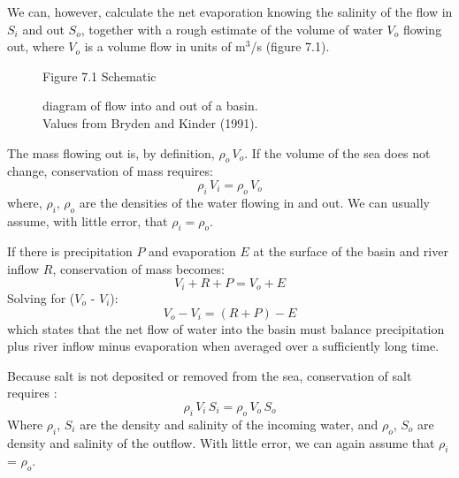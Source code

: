 We can, however, calculate the net evaporation knowing the salinity of
the flow in $S_i$ and out $S_o$, together with a rough estimate of the
volume of water $V_o$ flowing out, where $V_o$ is a volume flow in
units of m$^3$/s (figure 7.1).
\begin{figure}[h!]
\vspace{-1ex}
\centering
\footnotesize
Figure 7.1 Schematic \rule{0mm}{3ex}diagram of flow into and out of a
basin.\\Values from Bryden and Kinder (1991).

\label{fig:basin}
\vspace{-1ex}
\end{figure}

The mass flowing out is, by definition, $\rho_o \, V_o$. If the volume
of the sea does not change, conservation of mass requires:
\begin{equation}
\rho_i\,V_i = \rho_o\,V_o
\end{equation}
where, $\rho_i, \,\rho_o$ are the densities of the water flowing in
and out. We can usually assume, with little error,
that $\rho_i = \rho_o$.

If there is precipitation $P$ and evaporation $E$ at the surface of
the basin and river inflow $R$, conservation of mass becomes:
\begin{equation}
V_i + R + P = V_o + E
\end{equation}
Solving for ($V_o$ - $V_i$):
\begin{equation}
V_o - V_i = (R + P) - E
\end{equation}
which states that the net flow of water into the basin must balance
precipitation plus river inflow minus evaporation when averaged over a
sufficiently long time.

Because salt is not deposited or removed from the sea, conservation of
salt requires :
\begin{equation}
\rho_i\,V_i\,S_i = \rho_o\,V_o\,S_o
\end{equation}
Where $\rho_i$, $S_i$ are the density and salinity of the incoming
water, and $\rho_o$, $S_o$ are density and salinity of the
outflow. With little error, we can again assume that $\rho_i$ =
$\rho_o$.

